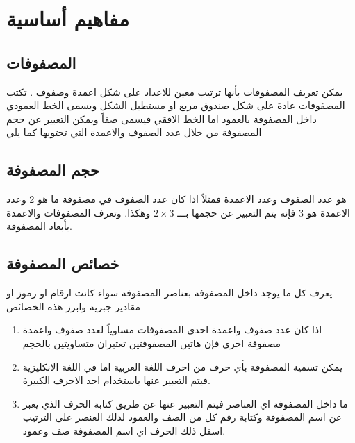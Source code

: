 \chapter{مفاهيم أساسية}

\section{المصفوفات}
يمكن تعريف المصفوفات بأنها ترتيب معين للاعداد على شكل اعمدة وصفوف . تكتب المصفوفات عادة على شكل صندوق مربع او مستطيل الشكل ويسمى الخط العمودي داخل المصفوفة بالعمود اما الخط الافقي فيسمى صفاً ويمكن التعبير عن حجم المصفوفة من خلال عدد الصفوف والاعمدة التي تحتويها كما يلي

\section{حجم المصفوفة}
هو عدد الصفوف وعدد الاعمدة فمثلاً اذا كان عدد الصفوف في مصفوفة ما هو 2 وعدد الاعمدة هو 3 فإنه يتم التعبير عن حجمها بـــ $2\times3$ وهكذا. وتعرف المصفوفات والاعمدة بأبعاد المصفوفة.

\section{خصائص المصفوفة}
يعرف كل ما يوجد داخل المصفوفة بعناصر المصفوفة سواء كانت ارقام او رموز او مقادير جبرية وابرز هذه الخصائص
\begin{enumerate}
	\item اذا كان عدد صفوف واعمدة احدى المصفوفات مساوياً لعدد صفوف واعمدة مصفوفة اخرى فإن هاتين المصفوفتين تعتبران متساويتين بالحجم 
	\item يمكن تسمية المصفوفة بأي حرف من احرف اللغة العربية اما في اللغة الانكليزية فيتم التعبير عنها باستخدام احد الاحرف الكبيرة.
	\item ما داخل المصفوفة اي العناصر فيتم التعبير عنها عن طريق كتابة الحرف الذي يعبر عن اسم المصفوفة وكتابة رقم كل من الصف والعمود لذلك العنصر على الترتيب اسفل ذلك الحرف اي اسم المصفوفة صف وعمود.
\end{enumerate}

